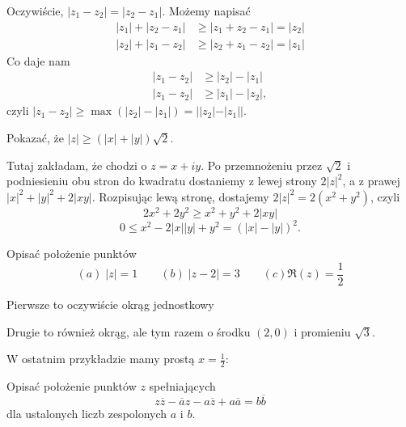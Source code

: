 \begin{solution}
  Oczywiście, $|z_1-z_2|=|z_2-z_1|$. Możemy napisać
  \begin{align*}
    |z_1|+|z_2-z_1|&\geq|z_1+z_2-z_1|=|z_2|\\ 
    |z_2|+|z_1-z_2|&\geq |z_2+z_1-z_2|=|z_1|
  \end{align*}
  Co daje nam
  \begin{align*}
    |z_1-z_2|&\geq |z_2|-|z_1|\\ 
    |z_1-z_2|&\geq |z_1|-|z_2|,
  \end{align*}
  czyli $|z_1-z_2|\geq \max(|z_2|-|z_1|)=||z_2|-|z_1||$.
\end{solution}

\begin{problem}
  Pokazać, że $|z|\geq (|x|+|y|)\sqrt{2}$.
\end{problem}

\begin{solution}
  Tutaj zakładam, że chodzi o $z=x+iy$. Po przemnożeniu przez $\sqrt{2}$ i podniesieniu obu stron do kwadratu dostaniemy z lewej strony $2|z|^2$, a z prawej $|x|^2+|y|^2+2|xy|$. Rozpisując lewą stronę, dostajemy $2|z|^2=2(x^2+y^2)$, czyli
  $$2x^2+2y^2\geq x^2+y^2+2|xy|$$
  $$0\leq x^2-2|x||y|+y^2= (|x|-|y|)^2.$$
\end{solution}

\begin{problem}
  Opisać położenie punktów 
  $$(a)\;|z|=1\quad \quad (b)\;|z-2|=3\quad \quad (c) \Re(z)=\frac{1}{2}$$
\end{problem}

\begin{solution}
  Pierwsze to oczywiście okrąg jednostkowy
  \begin{center}
  \end{center}

  Drugie to również okrąg, ale tym razem o środku $(2, 0)$ i promieniu $\sqrt{3}$.

  \begin{center}
  \end{center}

  W ostatnim przykładzie mamy prostą $x=\frac{1}{2}$:
  
  \begin{center}
  \end{center}
\end{solution}

\begin{problem}
  Opisać położenie punktów $z$ spełniających 
  $$z\overline{z}-\overline{a}z-a\overline{z}+a\overline{a}=b\overline{b}$$
  dla ustalonych liczb zespolonych $a$ i $b$.
\end{problem}
